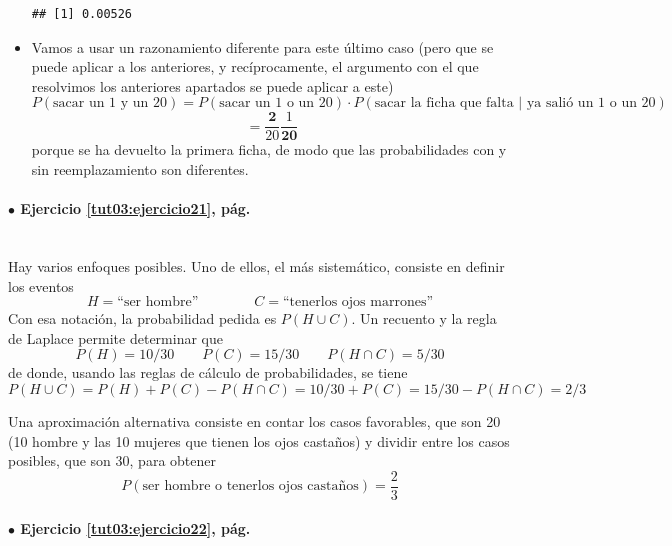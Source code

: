 \documentclass[10pt,a4paper]{article}\usepackage[]{graphicx}\usepackage[]{color}
\makeatletter
\newenvironment{kframe}{%
 \def\at@end@of@kframe{}%
 \ifinner\ifhmode%
  \def\at@end@of@kframe{\end{minipage}}%
  \begin{minipage}{\columnwidth}%
 \fi\fi%
 \def\FrameCommand##1{\hskip\@totalleftmargin \hskip-\fboxsep
 \colorbox{shadecolor}{##1}\hskip-\fboxsep
     \hskip-\linewidth \hskip-\@totalleftmargin \hskip\columnwidth}%
 \MakeFramed {\advance\hsize-\width
   \@totalleftmargin\z@ \linewidth\hsize
   \@setminipage}}%
 {\par\unskip\endMakeFramed%
 \at@end@of@kframe}
\newenvironment{knitrout}{}{} %
\newcounter {cont01}
\makeatother
\begin{document}
\begin{itemize}
\begin{knitrout}
\begin{kframe}
\begin{alltt}
\end{alltt}
\begin{verbatim}
## [1] 0.00526
\end{verbatim}
\end{kframe}
\end{knitrout}
\item Vamos a usar un razonamiento diferente para este último caso (pero que se puede aplicar a los anteriores, y recíprocamente, el argumento con el que resolvimos los anteriores apartados se puede aplicar a este) 
$$P(\text{sacar un 1 y un 20}) = P(\text{sacar un 1 o un 20})· 
P(\text{sacar la ficha que falta | ya salió un 1 o un 20})$$
$$=\frac{\textbf{2}}{20}\frac{1}{\textbf{20}} $$
porque se ha devuelto la primera ficha, de modo que las probabilidades con y sin reemplazamiento son diferentes.
\end{itemize}

\paragraph{\bf $\bullet$ Ejercicio \ref{tut03:ejercicio21}, pág. \pageref{tut03:ejercicio21}}
\label{tut03:ejercicio21:sol}\quad\\
Hay varios enfoques posibles. Uno de ellos, el m\'as sistem\'atico, 
consiste en definir los eventos 
\[H=\text{``ser hombre''}\qquad\qquad
  C=\text{``tenerlos ojos marrones''}\]
Con esa notaci\'on, la probabilidad pedida es $P(H\cup C)$. 
Un recuento y la regla de Laplace permite determinar que 
\[P(H)=10/30\qquad P(C)=15/30\qquad P(H\cap C)=5/30\]
de donde, usando las reglas de c\'alculo de probabilidades, 
se tiene 
\[P(H\cup C)=P(H)+P(C)-P(H\cap C)=10/30+P(C)=15/30- P(H\cap C)=2/3\]

Una aproximaci\'on alternativa consiste en contar los casos favorables, que son 20 (10 hombre y las 10 mujeres que tienen los ojos castaños) y dividir entre los casos posibles, que son 30, para obtener $$P(\text{ser hombre o tenerlos ojos castaños})=\frac{2}{3}$$


\paragraph{\bf $\bullet$ Ejercicio \ref{tut03:ejercicio22}, pág. \pageref{tut03:ejercicio22}}
\label{tut03:ejercicio22:sol}\quad\\
\end{document}
